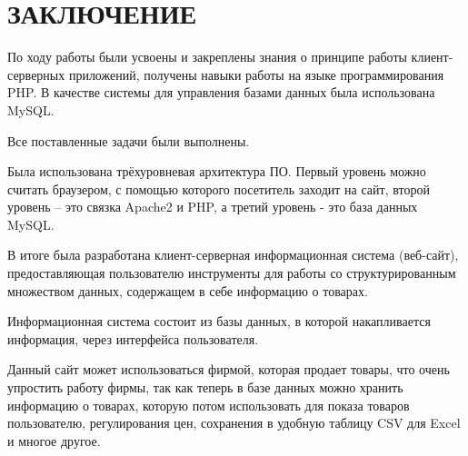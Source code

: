\newpage

\section*{ЗАКЛЮЧЕНИЕ}
{}

По ходу работы были усвоены и закреплены знания о принципе работы клиент-серверных приложений, получены навыки работы на языке программирования PHP. В качестве системы для управления базами данных была использована MySQL. 

Все поставленные задачи были выполнены.

Была использована трёхуровневая архитектура ПО. Первый уровень можно считать браузером, с помощью которого посетитель заходит на сайт, второй уровень – это связка Apache2 и PHP, а третий уровень - это база данных MySQL.

В итоге была разработана клиент-серверная информационная система (веб-сайт), предоставляющая пользователю инструменты для работы со структурированным множеством данных, содержащем в себе информацию о товарах. 

Информационная система состоит из базы данных, в которой накапливается информация, через интерфейса пользователя.

Данный сайт может использоваться фирмой, которая продает товары, что очень упростить работу фирмы, так как теперь в базе данных можно хранить информацию о товарах, которую потом использовать для показа товаров пользователю, регулирования цен, сохранения в удобную таблицу CSV для Excel и многое другое.

\newpage